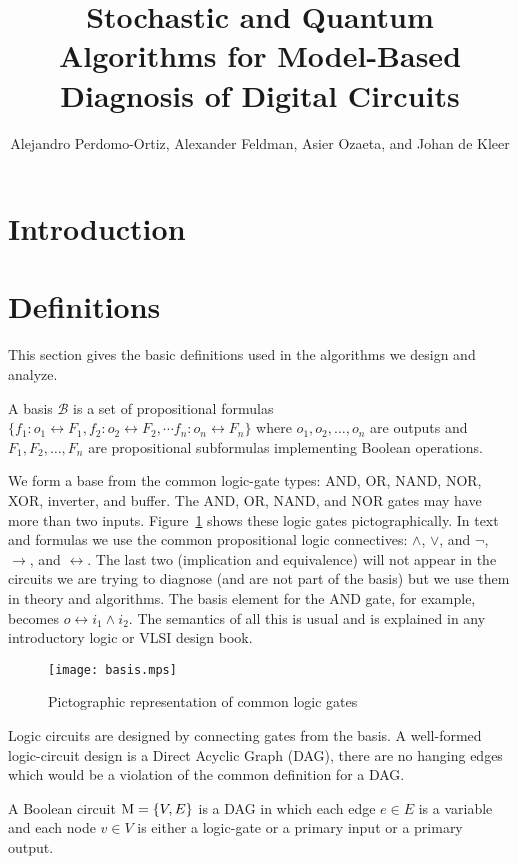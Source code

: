 \documentclass{article}
\title{Stochastic and Quantum Algorithms for Model-Based Diagnosis of Digital Circuits}
\author{Alejandro Perdomo-Ortiz, Alexander Feldman, Asier Ozaeta, and Johan de Kleer}
\begin{document}
\maketitle
\section{Introduction}

\section{Definitions}
%
This section gives the basic definitions used in the algorithms we
design and analyze.
%
\begin{definition}[Basis]
  A basis $\mathcal{B}$ is a set of propositional formulas $\{f_1 :
  o_1 \leftrightarrow F_1, f_2 : o_2 \leftrightarrow F_2, \cdots f_n :
  o_n \leftrightarrow F_n\}$ where $o_1, o_2, \ldots, o_n$ are outputs
  and $F_1, F_2, \ldots, F_n$ are propositional subformulas
  implementing Boolean operations.
\end{definition}
\noindent
%
We form a base from the common logic-gate types: AND, OR, NAND, NOR,
XOR, inverter, and buffer. The AND, OR, NAND, and NOR gates may have
more than two inputs. Figure~\ref{fig:basis} shows these logic gates
pictographically. In text and formulas we use the common propositional
logic connectives: $\wedge$, $\vee$, and $\neg$, $\rightarrow$, and
$\leftrightarrow$. The last two (implication and equivalence) will not
appear in the circuits we are trying to diagnose (and are not part of
the basis) but we use them in theory and algorithms. The basis element
for the AND gate, for example, becomes $o \leftrightarrow i_1 \wedge
i_2$. The semantics of all this is usual and is explained in any
introductory logic or VLSI design book.
%
\begin{figure}[htb]
\centering
\texttt{[image: basis.mps]}
\caption{Pictographic representation of common logic gates\label{fig:basis}}
\end{figure}
\par
%
Logic circuits are designed by connecting gates from the basis. A
well-formed logic-circuit design is a Direct Acyclic Graph (DAG),
there are no hanging edges which would be a violation of the common
definition for a DAG.
%
\begin{definition}
  A Boolean circuit $\mathrm{M} = \{V, E\}$ is a DAG in which each edge
  $e \in E$ is a variable and each node $v \in V$ is either a
  logic-gate or a primary input or a primary output.
\end{definition}
\end{document}

